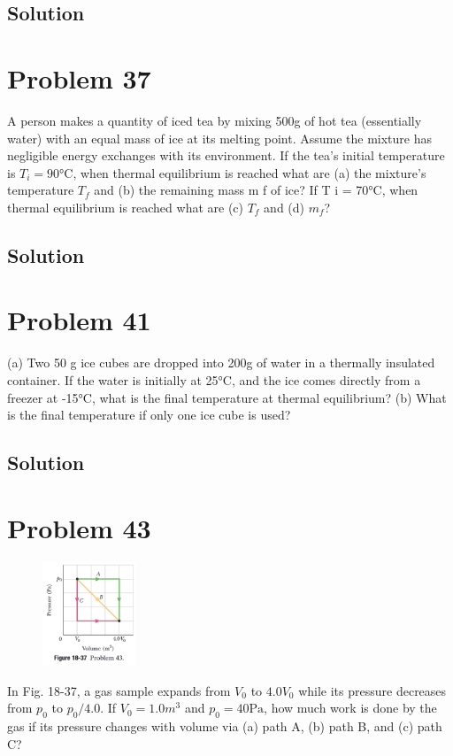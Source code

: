 \documentclass[12pt]{article}
\begin{document}
        \subsection{Solution}

    \pagebreak
    \section{Problem 37}
        A person makes a quantity of iced tea by mixing 500\unit{\gram} of hot tea (essentially water) with an equal mass of ice at its melting point. 
        Assume the mixture has negligible energy exchanges with its environment. 
        If the tea's initial temperature is $T_i = 90\unit{\celsius}$, when thermal equilibrium is reached what are (a) the mixture's temperature $T_f$ and (b) the remaining mass m f of ice? If T i = 70°C, when thermal equilibrium is reached what are (c) $T_f$ and (d) $m_f$?

        \subsection{Solution}

    \pagebreak
    \section{Problem 41}
        (a) Two 50 g ice cubes are dropped into 200\unit{\gram} of water in a thermally insulated container. 
        If the water is initially at 25\unit{\celsius}, and the ice comes directly from a freezer at -15\unit{\celsius}, what is the final temperature at thermal equilibrium? 
        (b) What is the final temperature if only one ice cube is used?
    
        \subsection{Solution}

    \pagebreak
    \section{Problem 43}
        \begin{figure}
            \vspace{-30pt}
            \includegraphics[width=0.25\textwidth]{picture_18-37.png} 
        \end{figure}
        In Fig. 18-37, a gas sample expands from $V_0$ to $4.0 V_0$ while its pressure decreases from $p_0$ to $p_0/4.0$. 
        If $V_0 = 1.0 m^3$ and $p_0 = 40 \unit{\pascal}$, how much work is done by the gas if its pressure changes with volume via (a) path A, (b) path B, and (c) path C?
\end{document}
